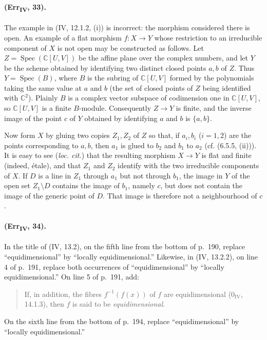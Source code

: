 \paragraph{(Err\textsubscript{IV}, 33).}
The example in (IV, 12.1.2, (i)) is incorrect: the morphism considered
there is open.  An example of a flat morphism $f:X\to Y$ whose
restriction to an irreducible component of $X$ is not open may be
constructed as follows.  Let
$Z=\operatorname{Spec}(\mathbb C[U,V])$ be the affine plane over the
complex numbers, and let $Y$ be the scheme obtained by identifying two
distinct closed points $a,b$ of $Z$.  Thus $Y=\operatorname{Spec}(B)$,
where $B$ is the subring of $\mathbb C[U,V]$ formed by the polynomials
taking the same value at $a$ and $b$ (the set of closed points of $Z$
being identified with $\mathbb C^2$).  Plainly $B$ is a complex vector
subspace of codimension one in $\mathbb C[U,V]$, so
$\mathbb C[U,V]$ is a finite $B$-module.  Consequently $Z\to Y$ is
finite, and the inverse image of the point $c$ of $Y$ obtained by
identifying $a$ and $b$ is $\{a,b\}$.

Now form $X$ by gluing two copies $Z_1,Z_2$ of $Z$ so that, if
$a_i,b_i$ ($i=1,2$) are the points corresponding to $a,b$, then $a_1$
is glued to $b_2$ and $b_1$ to $a_2$ (cf. (6.5.5, (ii))).  It is easy
to see (\emph{loc. cit.}) that the resulting morphism $X\to Y$ is flat
and finite (indeed, \'{e}tale), and that $Z_1$ and $Z_2$ identify with
the two irreducible components of $X$.  If $D$ is a line in $Z_1$
through $a_1$ but not through $b_1$, the image in $Y$ of the open set
$Z_1\setminus D$ contains the image of $b_1$, namely $c$, but does not
contain the image of the generic point of $D$.  That image is therefore
not a neighbourhood of $c$.

\paragraph{(Err\textsubscript{IV}, 34).}
In the title of (IV, 13.2), on the fifth line from the bottom of p.~190,
replace ``equidimensional'' by ``locally equidimensional.''  Likewise,
in (IV, 13.2.2), on line 4 of p.~191, replace both occurrences of
``equidimensional'' by ``locally equidimensional.''  On line 5 of
p.~191, add:
\begin{quote}
If, in addition, the fibres $f^{-1}(f(x))$ of $f$ are equidimensional
($0_{\mathrm{IV}}$, 14.1.3), then $f$ is said to be
\emph{equidimensional}.
\end{quote}
On the sixth line from the bottom of p.~194, replace
``equidimensional'' by ``locally equidimensional.''

